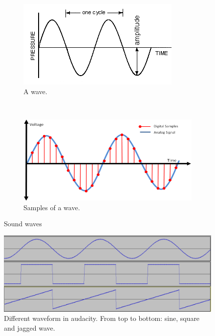 \documentclass[a4paper,12pt]{article}
\begin{document}
\begin{figure}[b]
        \centering
        \begin{subfigure}[b]{0.57\textwidth}
                \centering
                \includegraphics[width=\textwidth]{sinwave}
                \caption{A wave\cite{sinewave}.}
                \label{sinwave}
        \end{subfigure}%
        ~ 
        \begin{subfigure}[b]{0.52\textwidth}
                \centering
                \includegraphics[width=\textwidth]{digwave}
                \caption{Samples of a wave\cite{samples}.}
                \label{digwave}
        \end{subfigure}
    \caption{Sound waves}
   \label{waves}
\end{figure}
\begin{figure}[b]
        \centering
            \includegraphics[width=\textwidth]{waveforms}
            \caption{Different waveform in audacity. From top to bottom: sine, square and jagged wave.}
            \label{waveforms}
\end{figure}
\end{document}

